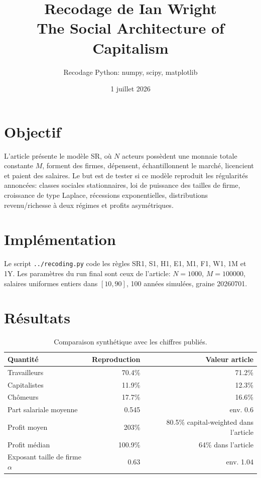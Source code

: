 \documentclass[11pt,a4paper]{article}
\title{Recodage de Ian Wright\\\large The Social Architecture of Capitalism}
\author{Recodage Python: numpy, scipy, matplotlib}
\date{1 juillet 2026}
\begin{document}
\maketitle

\section{Objectif}

L'article présente le modèle SR, où $N$ acteurs possèdent une monnaie totale constante $M$, forment des firmes, dépensent, échantillonnent le marché, licencient et paient des salaires. Le but est de tester si ce modèle reproduit les régularités annoncées: classes sociales stationnaires, loi de puissance des tailles de firme, croissance de type Laplace, récessions exponentielles, distributions revenu/richesse à deux régimes et profits asymétriques.

\section{Implémentation}

Le script \texttt{../recoding.py} code les règles SR1, S1, H1, E1, M1, F1, W1, 1M et 1Y. Les paramètres du run final sont ceux de l'article: $N=1000$, $M=100000$, salaires uniformes entiers dans $[10,90]$, 100 années simulées, graine 20260701.

\section{Résultats}

\begin{table}[h]
\centering
\begin{tabular}{lrr}
\toprule
Quantité & Reproduction & Valeur article \\
\midrule
Travailleurs & 70.4\% & 71.2\% \\
Capitalistes & 11.9\% & 12.3\% \\
Chômeurs & 17.7\% & 16.6\% \\
Part salariale moyenne & 0.545 & env. 0.6 \\
Profit moyen & 203\% & 80.5\% capital-weighted dans l'article \\
Profit médian & 100.9\% & 64\% dans l'article \\
Exposant taille de firme $\alpha$ & 0.63 & env. 1.04 \\
\bottomrule
\end{tabular}
\caption{Comparaison synthétique avec les chiffres publiés.}
\end{table}
\end{document}
